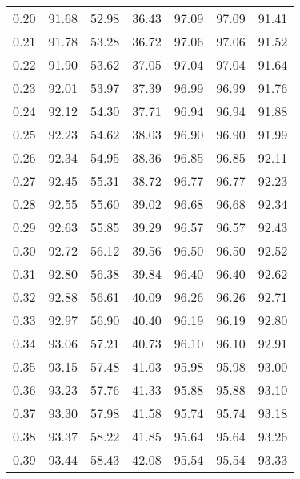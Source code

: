 \begin{tabular}{|c|c|c|c|c|c|c|}
      0.20 &     91.68 &     52.98 &      36.43 &   97.09 &      97.09 &         91.41 \\
      0.21 &     91.78 &     53.28 &      36.72 &   97.06 &      97.06 &         91.52 \\
      0.22 &     91.90 &     53.62 &      37.05 &   97.04 &      97.04 &         91.64 \\
      0.23 &     92.01 &     53.97 &      37.39 &   96.99 &      96.99 &         91.76 \\
      0.24 &     92.12 &     54.30 &      37.71 &   96.94 &      96.94 &         91.88 \\
      0.25 &     92.23 &     54.62 &      38.03 &   96.90 &      96.90 &         91.99 \\
      0.26 &     92.34 &     54.95 &      38.36 &   96.85 &      96.85 &         92.11 \\
      0.27 &     92.45 &     55.31 &      38.72 &   96.77 &      96.77 &         92.23 \\
      0.28 &     92.55 &     55.60 &      39.02 &   96.68 &      96.68 &         92.34 \\
      0.29 &     92.63 &     55.85 &      39.29 &   96.57 &      96.57 &         92.43 \\
      0.30 &     92.72 &     56.12 &      39.56 &   96.50 &      96.50 &         92.52 \\
      0.31 &     92.80 &     56.38 &      39.84 &   96.40 &      96.40 &         92.62 \\
      0.32 &     92.88 &     56.61 &      40.09 &   96.26 &      96.26 &         92.71 \\
      0.33 &     92.97 &     56.90 &      40.40 &   96.19 &      96.19 &         92.80 \\
      0.34 &     93.06 &     57.21 &      40.73 &   96.10 &      96.10 &         92.91 \\
      0.35 &     93.15 &     57.48 &      41.03 &   95.98 &      95.98 &         93.00 \\
      0.36 &     93.23 &     57.76 &      41.33 &   95.88 &      95.88 &         93.10 \\
      0.37 &     93.30 &     57.98 &      41.58 &   95.74 &      95.74 &         93.18 \\
      0.38 &     93.37 &     58.22 &      41.85 &   95.64 &      95.64 &         93.26 \\
      0.39 &     93.44 &     58.43 &      42.08 &   95.54 &      95.54 &         93.33 \\

\end{tabular}
